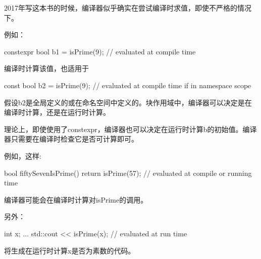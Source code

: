 \begin{notice}
2017年写这本书的时候，编译器似乎确实在尝试编译时求值，即使不严格的情况下。
\end{notice}

例如：

\begin{cpp}
constexpr bool b1 = isPrime(9); // evaluated at compile time
\end{cpp}

编译时计算该值，也适用于

\begin{cpp}
const bool b2 = isPrime(9); // evaluated at compile time if in namespace scope
\end{cpp}

假设b2是全局定义的或在命名空间中定义的。块作用域中，编译器可以决定是在编译时计算，还是在运行时计算。

\begin{notice}
理论上，即使使用了constexpr，编译器也可以决定在运行时计算b的初始值。编译器只需要在编译时检查它是否可计算即可。
\end{notice}

例如，这样:

\begin{cpp}
bool fiftySevenIsPrime() {
	return isPrime(57); // evaluated at compile or running time
}
\end{cpp}

编译器可能会在编译时计算对isPrime的调用。

另外：

\begin{cpp}
int x;
...
std::cout << isPrime(x); // evaluated at run time
\end{cpp}

将生成在运行时计算x是否为素数的代码。

